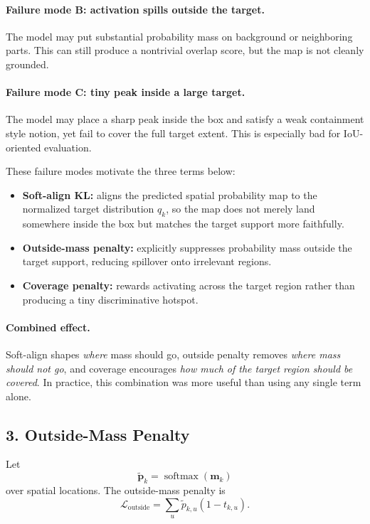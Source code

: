 \documentclass[11pt]{article}
\begin{document}
\paragraph{Failure mode B: activation spills outside the target.}
The model may put substantial probability mass on background or neighboring
parts. This can still produce a nontrivial overlap score, but the map is not
cleanly grounded.

\paragraph{Failure mode C: tiny peak inside a large target.}
The model may place a sharp peak inside the box and satisfy a weak containment
style notion, yet fail to cover the full target extent. This is especially bad
for IoU-oriented evaluation.

These failure modes motivate the three terms below:

\begin{itemize}
    \item \textbf{Soft-align KL:} aligns the predicted spatial probability map to
    the normalized target distribution $q_k$, so the map does not merely land
    somewhere inside the box but matches the target support more faithfully.
    \item \textbf{Outside-mass penalty:} explicitly suppresses probability mass
    outside the target support, reducing spillover onto irrelevant regions.
    \item \textbf{Coverage penalty:} rewards activating across the target region
    rather than producing a tiny discriminative hotspot.
\end{itemize}

\paragraph{Combined effect.}
Soft-align shapes \emph{where} mass should go, outside penalty removes
\emph{where mass should not go}, and coverage encourages \emph{how much of the
target region should be covered}. In practice, this combination was more useful
than using any single term alone.

\subsection{3. Outside-Mass Penalty}
Let
\[
\tilde{\mathbf{p}}_k = \operatorname{softmax}(\mathbf{m}_k)
\]
over spatial locations. The outside-mass penalty is
\[
\mathcal{L}_{\mathrm{outside}}
=
\sum_u \tilde{p}_{k,u}(1 - t_{k,u}).
\]
\end{document}
